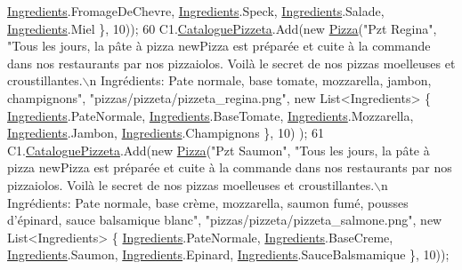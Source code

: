 \begin{DoxyCode}
      \hyperlink{namespaceModele_a001a8e89e56a724f24a249ba98080d41}{Ingredients}.FromageDeChevre, \hyperlink{namespaceModele_a001a8e89e56a724f24a249ba98080d41}{Ingredients}.Speck, 
      \hyperlink{namespaceModele_a001a8e89e56a724f24a249ba98080d41}{Ingredients}.Salade, \hyperlink{namespaceModele_a001a8e89e56a724f24a249ba98080d41}{Ingredients}.Miel \}, 10));
60             C1.\hyperlink{classModele_1_1Catalogue_ac5490e1026b5b08d43e30b68da893423}{CataloguePizzeta}.Add(\textcolor{keyword}{new} \hyperlink{classModele_1_1Pizza}{Pizza}(\textcolor{stringliteral}{"Pzt Regina"}, \textcolor{stringliteral}{"Tous les jours, la pâte à
       pizza newPizza est préparée et cuite à la commande dans nos restaurants par nos pizzaiolos. Voilà le secret
       de nos pizzas moelleuses et croustillantes.\(\backslash\)n Ingrédients: Pate normale, base tomate, mozzarella, jambon,
       champignons"}, \textcolor{stringliteral}{"pizzas/pizzeta/pizzeta\_regina.png"}, \textcolor{keyword}{new} List<Ingredients> \{ 
      \hyperlink{namespaceModele_a001a8e89e56a724f24a249ba98080d41}{Ingredients}.PateNormale, \hyperlink{namespaceModele_a001a8e89e56a724f24a249ba98080d41}{Ingredients}.BaseTomate, 
      \hyperlink{namespaceModele_a001a8e89e56a724f24a249ba98080d41}{Ingredients}.Mozzarella, \hyperlink{namespaceModele_a001a8e89e56a724f24a249ba98080d41}{Ingredients}.Jambon, \hyperlink{namespaceModele_a001a8e89e56a724f24a249ba98080d41}{Ingredients}.Champignons \}, 10)
      );
61             C1.\hyperlink{classModele_1_1Catalogue_ac5490e1026b5b08d43e30b68da893423}{CataloguePizzeta}.Add(\textcolor{keyword}{new} \hyperlink{classModele_1_1Pizza}{Pizza}(\textcolor{stringliteral}{"Pzt Saumon"}, \textcolor{stringliteral}{"Tous les jours, la pâte à
       pizza newPizza est préparée et cuite à la commande dans nos restaurants par nos pizzaiolos. Voilà le secret
       de nos pizzas moelleuses et croustillantes.\(\backslash\)n Ingrédients: Pate normale, base crème, mozzarella, saumon
       fumé, pousses d’épinard, sauce balsamique blanc"}, \textcolor{stringliteral}{"pizzas/pizzeta/pizzeta\_salmone.png"}, \textcolor{keyword}{new} List<Ingredients> \{
       \hyperlink{namespaceModele_a001a8e89e56a724f24a249ba98080d41}{Ingredients}.PateNormale, \hyperlink{namespaceModele_a001a8e89e56a724f24a249ba98080d41}{Ingredients}.BaseCreme, 
      \hyperlink{namespaceModele_a001a8e89e56a724f24a249ba98080d41}{Ingredients}.Saumon, \hyperlink{namespaceModele_a001a8e89e56a724f24a249ba98080d41}{Ingredients}.Epinard, \hyperlink{namespaceModele_a001a8e89e56a724f24a249ba98080d41}{Ingredients}.SauceBalsmamique \}, 
      10));

\end{DoxyCode}

